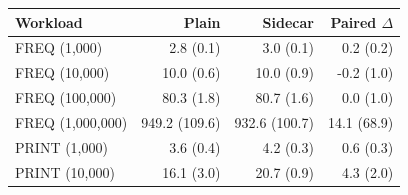 \begin{tabular}{lrrr}
\toprule
Workload & Plain & Sidecar & Paired $\Delta$ \\
\midrule
FREQ (1,000) & 2.8 (0.1) & 3.0 (0.1) & 0.2 (0.2) \\
FREQ (10,000) & 10.0 (0.6) & 10.0 (0.9) & -0.2 (1.0) \\
FREQ (100,000) & 80.3 (1.8) & 80.7 (1.6) & 0.0 (1.0) \\
FREQ (1,000,000) & 949.2 (109.6) & 932.6 (100.7) & 14.1 (68.9) \\
PRINT (1,000) & 3.6 (0.4) & 4.2 (0.3) & 0.6 (0.3) \\
PRINT (10,000) & 16.1 (3.0) & 20.7 (0.9) & 4.3 (2.0) \\
\bottomrule
\end{tabular}
